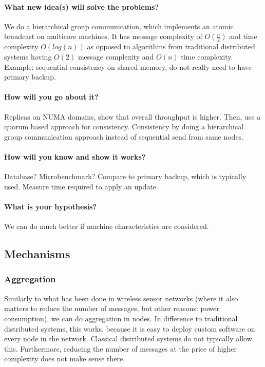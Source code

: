 \documentclass{article}
\begin{document}
\paragraph{What new idea(s) will solve the problems?} We do a
hierarchical group communication, which implements an atomic
broadcast on multicore machines. It has message complexity of
$O(\frac{n}{2})$ and time complexity $O(log(n))$ as opposed to
algorithms from traditional distributed systems having $O(2)$ message
complexity and $O(n)$ time complexity. %
\\
{\footnotesize Example: sequential consistency on shared memory, do
  not really need to have primary backup.}

\paragraph{How will you go about it?} Replicas on NUMA domains, show
that overall throughput is higher. Then, use a quorum based approach for
consistency. Consistency by doing a hierarchical group communication
approach instead of sequential send from same nodes.

\paragraph{How will you know and show it works?} Database?
Microbenchmark? Compare to primary backup, which is typically
used. Measure time required to apply an update.

\paragraph{What is your hypothesis?} We can do much better if machine
characteristics are considered.

\subsection{Mechanisms}

\subsubsection{Aggregation}

Similarly to what has been done in wireless sensor networks (where it
also matters to reduce the number of messages, but other reasons:
power consumption), we can do aggregation in nodes. In difference to
traditional distributed systems, this works, because it is easy to
deploy custom software on every node in the network. Classical
distributed systems do not typically allow this. Furthermore, reducing
the number of messages at the price of higher complexity does not make
sense there.
\end{document}
